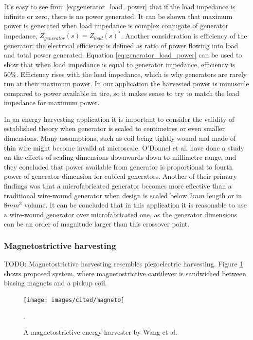 It's easy to see from \eqref{eq:generator_load_power} that if the load impedance is infinite or zero, there is no power generated. It can be shown that maximum power is generated when load impedance is complex conjugate of generator impedance, $Z_{generator}(s) = {Z_{load}(s)}^*$. Another consideration is efficiency of the generator: the electrical efficiency is defined as ratio of power flowing into load and total power generated. Equation \eqref{eq:generator_load_power} can be used to show that when load impedance is equal to generator impedance, efficiency is $ 50 \%$. Efficiency rises with the load impedance, which is why generators are rarely run at their maximum power. In our application the harvested power is minuscule compared to power available in tire, so it makes sense to try to match the load impedance for maximum power.

In an energy harvesting application it is important to consider the validity of established theory when generator is scaled to centimetres or even smaller dimensions. Many assumptions, such as coil being tightly wound and made of thin wire might become invalid at microscale. O'Donnel et al. \cite{ODonnell2007} have done a study on the effects of scaling dimensions downwards down to millimetre range, and they concluded that power available from generator is proportional to fourth power of generator dimension for cubical generators. Another of their primary findings was that a microfabricated generator becomes more effective than a traditional wire-wound generator when design is scaled below $2 mm$ length or in $8 mm^3$ volume. It can be concluded that in this application it is reasonable to use a wire-wound generator over microfabricated one, as the generator dimensions can be an order of magnitude larger than this crossover point. 

\subsubsection{Magnetostrictive harvesting}
TODO: Magnetostrictive harvesting resembles piezoelectric harvesting. Figure \ref{magneto} shows proposed system, where magnetostrictive cantilever is sandwiched between biasing magnets and a pickup coil.  

\begin{figure}[htb]
\begin{center}
\texttt{[image: images/cited/magneto]}
\end{center}
\caption{A magnetostrictive energy harvester by Wang et al. \cite{Wang2006}}.
\label{magneto}
\end{figure}


